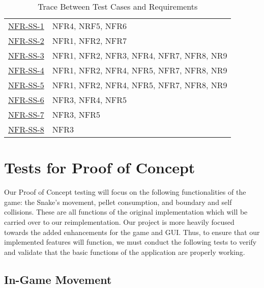 \documentclass[12pt, titlepage]{article}
\begin{document}
\begin{table}[H]
\begin{tabular}{p{} p{}}
\midrule
\hyperref[nfr:ss-1]{NFR-SS-1} & NFR4, NRF5, NFR6\\
\hyperref[nfr:ss-2]{NFR-SS-2} & NFR1, NFR2, NFR7\\
\hyperref[nfr:ss-3]{NFR-SS-3} & NFR1, NFR2, NFR3, NFR4, NFR7, NFR8, NR9\\
\hyperref[nfr:ss-4]{NFR-SS-4} & NFR1, NFR2, NFR4, NFR5, NFR7, NFR8, NR9\\
\hyperref[nfr:ss-5]{NFR-SS-5} & NFR1, NFR2, NFR4, NFR5, NFR7, NFR8, NR9\\
\hyperref[nfr:ss-6]{NFR-SS-6} & NFR3, NFR4, NFR5\\
\hyperref[nfr:ss-7]{NFR-SS-7} & NFR3, NFR5\\
\hyperref[nfr:ss-8]{NFR-SS-8} & NFR3\\
\bottomrule
\end{tabular}

\caption{Trace Between Test Cases and Requirements}
\label{TblRT}
\end{table}
		
\section{Tests for Proof of Concept}
Our Proof of Concept testing will focus on the following functionalities of the game: the Snake's movement, pellet consumption, and boundary and self collisions. These are all functions of the original implementation which will be carried over to our reimplementation. Our project is more heavily focused towards the added enhancements for the game and GUI. Thus, to ensure that our implemented features will function, we must conduct the following tests to verify and validate that the basic functions of the application are properly working.

\subsection{In-Game Movement}
\end{document}
